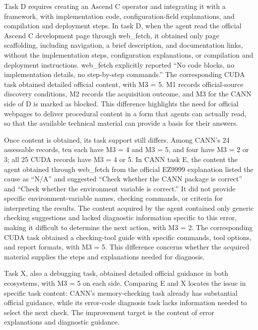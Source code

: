 \documentclass[manuscript,review,anonymous]{acmart}
\begin{document}
Task D requires creating an Ascend C operator and integrating it with a framework, with implementation code, configuration-field explanations, and compilation and deployment steps. In task D, when the agent read the official Ascend C development page through web\_fetch, it obtained only page scaffolding, including navigation, a brief description, and documentation links, without the implementation steps, configuration explanations, or compilation and deployment instructions. web\_fetch explicitly reported ``No code blocks, no implementation details, no step-by-step commands.'' The corresponding CUDA task obtained detailed official content, with M3 = 5. M1 records official-source discovery conditions, M2 records the acquisition outcome, and M3 for the CANN side of D is marked as blocked. This difference highlights the need for official webpages to deliver procedural content in a form that agents can actually read, so that the available technical material can provide a basis for their answers.

Once content is obtained, its task support still differs. Among CANN's 24 assessable records, ten each have M3 = 4 and M3 = 5, and four have M3 = 2 or 3; all 25 CUDA records have M3 = 4 or 5. In CANN task E, the content the agent obtained through web\_fetch from the official EZ9999 explanation listed the cause as ``N/A'' and suggested ``Check whether the CANN package is correct'' and ``Check whether the environment variable is correct.'' It did not provide specific environment-variable names, checking commands, or criteria for interpreting the results. The content acquired by the agent contained only generic checking suggestions and lacked diagnostic information specific to this error, making it difficult to determine the next action, with M3 = 2. The corresponding CUDA task obtained a checking-tool guide with specific commands, tool options, and report formats, with M3 = 5. This difference concerns whether the acquired material supplies the steps and explanations needed for diagnosis.

Task X, also a debugging task, obtained detailed official guidance in both ecosystems, with M3 = 5 on each side. Comparing E and X locates the issue in specific task content: CANN's memory-checking task already has substantial official guidance, while its error-code diagnosis task lacks information needed to select the next check. The improvement target is the content of error explanations and diagnostic guidance.
\end{document}
